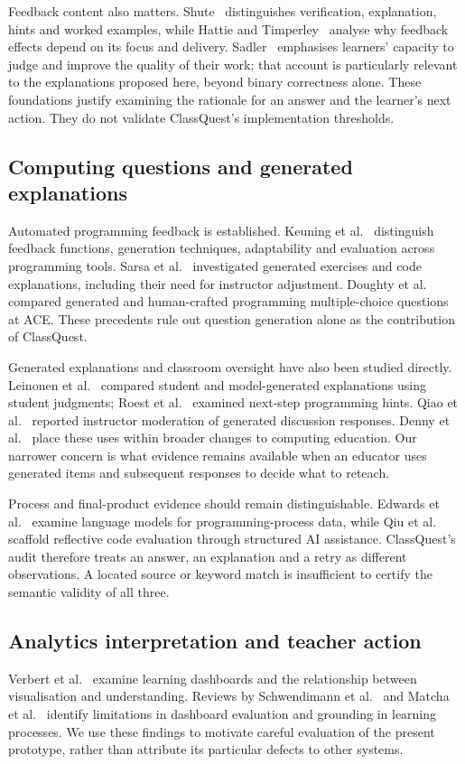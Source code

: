 Feedback content also matters. Shute~\cite{shute} distinguishes verification, explanation, hints and worked examples, while Hattie and Timperley~\cite{hattie} analyse why feedback effects depend on its focus and delivery. Sadler~\cite{sadler} emphasises learners' capacity to judge and improve the quality of their work; that account is particularly relevant to the explanations proposed here, beyond binary correctness alone. These foundations justify examining the rationale for an answer and the learner's next action. They do not validate ClassQuest's implementation thresholds.

\subsection{Computing questions and generated explanations}
Automated programming feedback is established. Keuning et al.~\cite{keuning} distinguish feedback functions, generation techniques, adaptability and evaluation across programming tools. Sarsa et al.~\cite{sarsa} investigated generated exercises and code explanations, including their need for instructor adjustment. Doughty et al.~\cite{doughty} compared generated and human-crafted programming multiple-choice questions at ACE. These precedents rule out question generation alone as the contribution of ClassQuest.

Generated explanations and classroom oversight have also been studied directly. Leinonen et al.~\cite{leinonen} compared student and model-generated explanations using student judgments; Roest et al.~\cite{roest} examined next-step programming hints. Qiao et al.~\cite{qiao} reported instructor moderation of generated discussion responses. Denny et al.~\cite{dennyai} place these uses within broader changes to computing education. Our narrower concern is what evidence remains available when an educator uses generated items and subsequent responses to decide what to reteach.

Process and final-product evidence should remain distinguishable. Edwards et al.~\cite{edwards} examine language models for programming-process data, while Qiu et al.~\cite{qiu} scaffold reflective code evaluation through structured AI assistance. ClassQuest's audit therefore treats an answer, an explanation and a retry as different observations. A located source or keyword match is insufficient to certify the semantic validity of all three.

\subsection{Analytics interpretation and teacher action}
Verbert et al.~\cite{verbert} examine learning dashboards and the relationship between visualisation and understanding. Reviews by Schwendimann et al.~\cite{schwendimann} and Matcha et al.~\cite{matcha} identify limitations in dashboard evaluation and grounding in learning processes. We use these findings to motivate careful evaluation of the present prototype, rather than attribute its particular defects to other systems.

